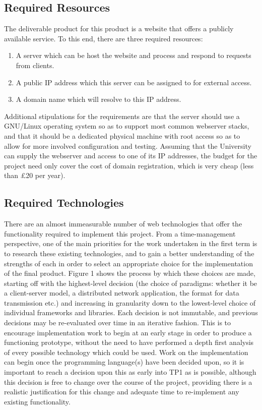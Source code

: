 \subsection{Required Resources}
The deliverable product for this product is a website that offers a publicly
available service. To this end, there are three required resources:

\begin{enumerate}
\item A server which can be host the website and process and respond to requests
  from clients.
\item A public IP address which this server can be assigned to for external
  access.
\item A domain name which will resolve to this IP address.
\end{enumerate}

Additional stipulations for the requirements are that the server should use a
GNU/Linux operating system so as to support most common webserver stacks, and
that it should be a dedicated physical machine with root access so as to allow
for more involved configuration and testing. Assuming that the University can
supply the webserver and access to one of its IP addresses, the budget for the
project need only cover the cost of domain registration, which is very cheap
(less than £20 per year).

\subsection{Required Technologies}
There are an almost immeasurable number of web technologies that offer the
functionality required to implement this project. From a time-management
perspective, one of the main priorities for the work undertaken in the first
term is to research these existing technologies, and to gain a better
understanding of the strengths of each in order to select an appropriate choice
for the implementation of the final product. Figure 1 shows the process by which
these choices are made, starting off with the highest-level decision (the choice
of paradigms: whether it be a client-server model, a distributed network
application, the format for data transmission etc.) and increasing in
granularity down to the lowest-level choice of individual frameworks and
libraries. Each decision is not immutable, and previous decisions may be
re-evaluated over time in an iterative fashion. This is to encourage
implementation work to begin at an early stage in order to produce a functioning
prototype, without the need to have performed a depth first analysis of every
possible technology which could be used. Work on the implementation can begin
once the programming language(s) have been decided upon, so it is important to
reach a decision upon this as early into TP1 as is possible, although this
decision is free to change over the course of the project, providing there is a
realistic justification for this change and adequate time to re-implement any
existing functionality.

